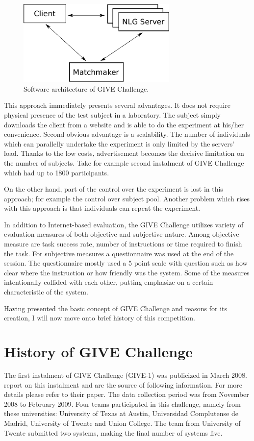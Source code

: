 \begin{figure}[!htbp]
  \centering
	\includegraphics[width=0.7\textwidth]{Images/give-client-servers}
	\caption{Software architecture of GIVE Challenge.}
	\label{fig:give-clientserver}
\end{figure}

This approach immediately presents several advantages. It does not require physical presence of the test subject in a laboratory. The subject simply downloads the client from a website and is able to do the experiment at his/her convenience. Second obvious advantage is a scalability. The number of individuals which can parallelly undertake the experiment is only limited by the servers' load. Thanks to the low costs, advertisement becomes the decisive limitation on the number of subjects. Take for example second instalment of GIVE Challenge which had up to 1800 participants.

On the other hand, part of the control over the experiment is lost in this approach; for example the control over subject pool. Another problem which rises with this approach is that individuals can repeat the experiment.

In addition to Internet-based evaluation, the GIVE Challenge utilizes variety of evaluation measures of both objective and subjective nature. Among objective measure are task success rate, number of instructions or time required to finish the task. For subjective measures a questionnaire was used at the end of the session. The questionnaire mostly used a 5 point scale with question such as how clear where the instruction or how friendly was the system. Some of the measures intentionally collided with each other, putting emphasize on a certain characteristic of the system.

Having presented the basic concept of GIVE Challenge and reasons for its creation, I will now move onto brief history of this competition. 

 
\section{History of GIVE Challenge}
The first instalment of GIVE Challenge (GIVE-1) was publicized in March 2008. \citet{koller2010first} report on this instalment and are the source of following information. For more details please refer to their paper. The data collection period was from November 2008 to February 2009. Four teams participated in this challenge, namely from these universities: University of Texas at Austin, Universidad Complutense de Madrid, University of Twente and Union College. The team from University of Twente submitted two systems, making the final number of systems five.


